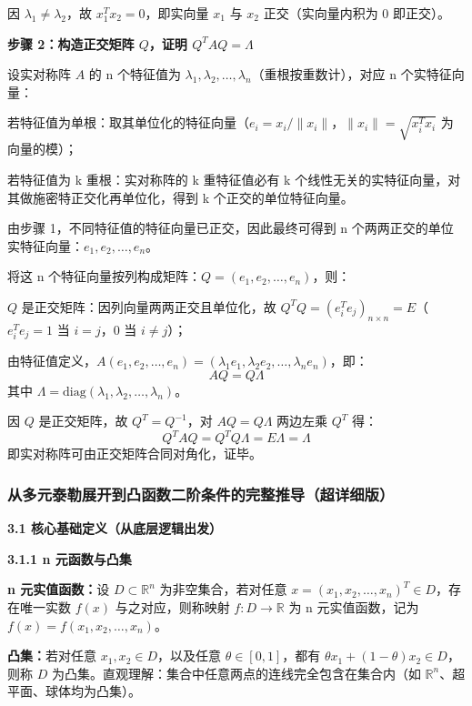 \documentclass[10pt]{article}
\numberwithin{equation}{section}
\theoremstyle{plain}
\theoremstyle{definition}
\theoremstyle{remark}
\newcommand{\R}{\mathbb{R}}
\newcommand{\norm}[1]{\lVert #1 \rVert}
\begin{document}
因 $\lambda_1\neq\lambda_2$，故 $x_1^T x_2=0$，即实向量 $x_1$ 与 $x_2$ 正交（实向量内积为 0 即正交）。

{\par\vspace{0.8ex}\noindent\normalsize\bfseries\color{secblue} 步骤 2：构造正交矩阵 $Q$，证明 $Q^T AQ=\Lambda$\par}

设实对称阵 $A$ 的 n 个特征值为 $\lambda_1,\lambda_2,\ldots,\lambda_n$（重根按重数计），对应 n 个实特征向量：

若特征值为单根：取其单位化的特征向量（$e_i=x_i/\norm{x_i}$，$\norm{x_i}=\sqrt{x_i^T x_i}$ 为向量的模）；

若特征值为 k 重根：实对称阵的 k 重特征值必有 k 个线性无关的实特征向量，对其做施密特正交化再单位化，得到 k 个正交的单位特征向量。

由步骤 1，不同特征值的特征向量已正交，因此最终可得到 n 个两两正交的单位实特征向量：$e_1,e_2,\ldots,e_n$。

将这 n 个特征向量按列构成矩阵：$Q=(e_1,e_2,\ldots,e_n)$，则：

$Q$ 是正交矩阵：因列向量两两正交且单位化，故 $Q^T Q=(e_i^T e_j)_{n\times n}=E$（$e_i^T e_j=1$ 当 $i=j$，0 当 $i\neq j$）；

由特征值定义，$A(e_1,e_2,\ldots,e_n)=(\lambda_1 e_1,\lambda_2 e_2,\ldots,\lambda_n e_n)$，即：
\[AQ=Q\Lambda\]
其中 $\Lambda=\text{diag}(\lambda_1,\lambda_2,\ldots,\lambda_n)$。

因 $Q$ 是正交矩阵，故 $Q^T=Q^{-1}$，对 $AQ=Q\Lambda$ 两边左乘 $Q^T$ 得：
\[Q^T AQ=Q^T Q\Lambda=E\Lambda=\Lambda\]
即实对称阵可由正交矩阵合同对角化，证毕。

\subsubsection{从多元泰勒展开到凸函数二阶条件的完整推导（超详细版）}

\textbf{3.1 核心基础定义（从底层逻辑出发）}

\textbf{3.1.1 n 元函数与凸集}

\textbf{n 元实值函数：}设 $D\subset\R^n$ 为非空集合，若对任意 $x=(x_1,x_2,\ldots,x_n)^T\in D$，存在唯一实数 $f(x)$ 与之对应，则称映射 $f:D\to\R$ 为 n 元实值函数，记为 $f(x)=f(x_1,x_2,\ldots,x_n)$。

\textbf{凸集：}若对任意 $x_1,x_2\in D$，以及任意 $\theta\in[0,1]$，都有 $\theta x_1+(1-\theta)x_2\in D$，则称 $D$ 为凸集。直观理解：集合中任意两点的连线完全包含在集合内（如 $\R^n$、超平面、球体均为凸集）。
\end{document}
